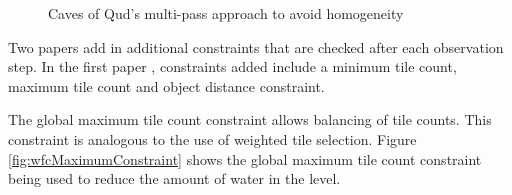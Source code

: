 \begin{figure}[H]
    \centering
    \hfill
    \caption{Caves of Qud's multi-pass approach to avoid homogeneity \cite{GDC_caves_of_qud}}
    \label{fig:cavesOfQudWFCHomogeneity}
\end{figure}

Two papers add in additional constraints that are checked after each observation step. In the first paper \cite{WFC_Automatic_Rules_And_Better_Symmetries}, constraints added include a minimum tile count, maximum tile count and object distance constraint.

The global maximum tile count constraint allows balancing of tile counts. This constraint is analogous to the use of weighted tile selection. Figure \ref{fig:wfcMaximumConstraint} shows the global maximum tile count constraint being used to reduce the amount of water in the level.

